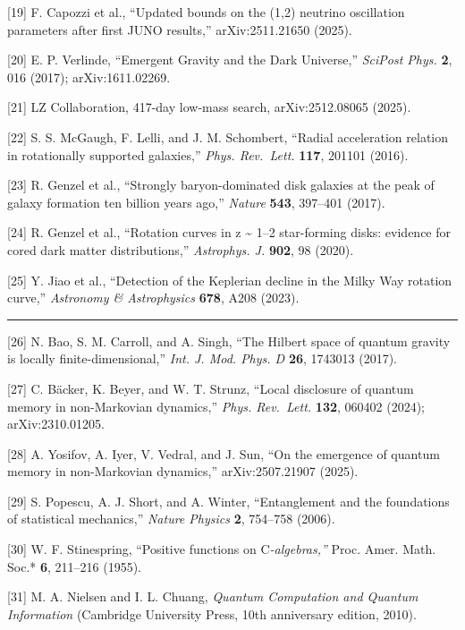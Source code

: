 \documentclass[
]{article}
\begin{document}
{[}19{]} F. Capozzi et al., ``Updated bounds on the (1,2) neutrino
oscillation parameters after first JUNO results,'' arXiv:2511.21650
(2025).

{[}20{]} E. P. Verlinde, ``Emergent Gravity and the Dark Universe,''
\emph{SciPost Phys.} \textbf{2}, 016 (2017); arXiv:1611.02269.

{[}21{]} LZ Collaboration, 417-day low-mass search, arXiv:2512.08065
(2025).

{[}22{]} S. S. McGaugh, F. Lelli, and J. M. Schombert, ``Radial
acceleration relation in rotationally supported galaxies,'' \emph{Phys.
Rev.~Lett.} \textbf{117}, 201101 (2016).

{[}23{]} R. Genzel et al., ``Strongly baryon-dominated disk galaxies at
the peak of galaxy formation ten billion years ago,'' \emph{Nature}
\textbf{543}, 397--401 (2017).

{[}24{]} R. Genzel et al., ``Rotation curves in z \textasciitilde{} 1--2
star-forming disks: evidence for cored dark matter distributions,''
\emph{Astrophys. J.} \textbf{902}, 98 (2020).

{[}25{]} Y. Jiao et al., ``Detection of the Keplerian decline in the
Milky Way rotation curve,'' \emph{Astronomy \& Astrophysics}
\textbf{678}, A208 (2023).

\begin{center}\rule{0.5\linewidth}{0.5pt}\end{center}

{[}26{]} N. Bao, S. M. Carroll, and A. Singh, ``The Hilbert space of
quantum gravity is locally finite-dimensional,'' \emph{Int. J. Mod.
Phys. D} \textbf{26}, 1743013 (2017).

{[}27{]} C. Bäcker, K. Beyer, and W. T. Strunz, ``Local disclosure of
quantum memory in non-Markovian dynamics,'' \emph{Phys. Rev.~Lett.}
\textbf{132}, 060402 (2024); arXiv:2310.01205.

{[}28{]} A. Yosifov, A. Iyer, V. Vedral, and J. Sun, ``On the emergence
of quantum memory in non-Markovian dynamics,'' arXiv:2507.21907 (2025).

{[}29{]} S. Popescu, A. J. Short, and A. Winter, ``Entanglement and the
foundations of statistical mechanics,'' \emph{Nature Physics}
\textbf{2}, 754--758 (2006).

{[}30{]} W. F. Stinespring, ``Positive functions on C\emph{-algebras,''
}Proc. Amer. Math. Soc.* \textbf{6}, 211--216 (1955).

{[}31{]} M. A. Nielsen and I. L. Chuang, \emph{Quantum Computation and
Quantum Information} (Cambridge University Press, 10th anniversary
edition, 2010).
\end{document}
